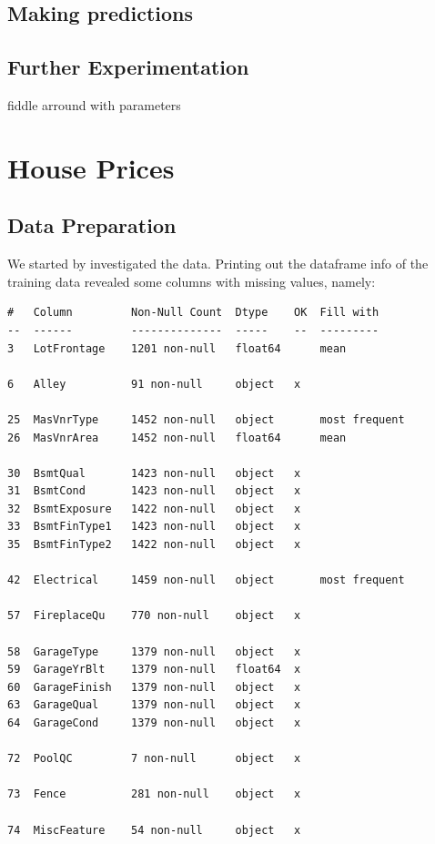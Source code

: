 \documentclass[a4paper, 12pt, twoside]{report}
\begin{document}
\subsection{Making predictions}

\subsection{Further Experimentation}
fiddle arround with parameters


\clearpage

\section{House Prices}

\subsection{Data Preparation}
We started by investigated the data.
Printing out the dataframe info of the training data revealed some columns with missing values, namely:

\begin{Verbatim}[commandchars=\\\{\}]
#   Column         Non-Null Count  Dtype    OK  Fill with
--  ------         --------------  -----    --  ---------
3   LotFrontage    1201 non-null   float64      mean

6   Alley          91 non-null     object   x

25  MasVnrType     1452 non-null   object       most frequent
26  MasVnrArea     1452 non-null   float64      mean

30  BsmtQual       1423 non-null   object   x
31  BsmtCond       1423 non-null   object   x
32  BsmtExposure   1422 non-null   object   x
33  BsmtFinType1   1423 non-null   object   x
35  BsmtFinType2   1422 non-null   object   x

42  Electrical     1459 non-null   object       most frequent

57  FireplaceQu    770 non-null    object   x

58  GarageType     1379 non-null   object   x
59  GarageYrBlt    1379 non-null   float64  x
60  GarageFinish   1379 non-null   object   x
63  GarageQual     1379 non-null   object   x
64  GarageCond     1379 non-null   object   x

72  PoolQC         7 non-null      object   x

73  Fence          281 non-null    object   x

74  MiscFeature    54 non-null     object   x
\end{Verbatim}
\end{document}
